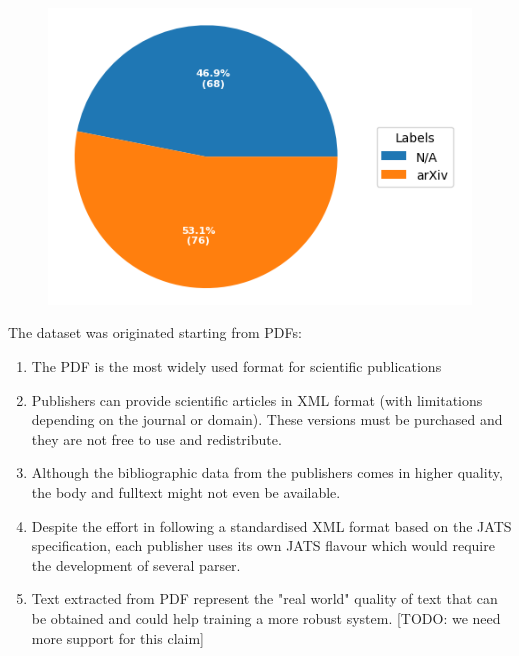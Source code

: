 \documentclass[a4paper,10pt]{article}
\begin{document}


\begin{figure}[h]
    \centering
    \includegraphics[width=0.7\linewidth]{pie-arxiv-papers.png}
    \label{fig:arxiv-rate}
\end{figure}

The dataset was originated starting from PDFs: 
\begin{enumerate}
    \item The PDF is the most widely used format for scientific publications \cite{johnson2018pdfStatistics}
    \item Publishers can provide scientific articles in XML format (with limitations depending on the journal or domain). These versions must be purchased and they are not free to use and redistribute. \item Although the bibliographic data from the publishers comes in higher quality, the body and fulltext might not even be available. 
    \item Despite the effort in following a standardised XML format based on the JATS specification, each publisher uses its own JATS flavour which would require the development of several parser.
    \item Text extracted from PDF represent the "real world" quality of text that can be obtained and could help training a more robust system. [TODO: we need more support for this claim]
\end{enumerate}
\end{document}
